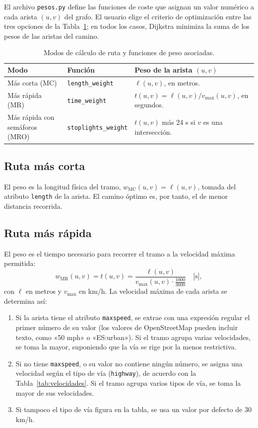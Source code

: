 \documentclass[11pt,a4paper]{article}
\newcommand{\code}[1]{\texttt{#1}}
\begin{document}
El archivo \code{pesos.py} define las funciones de coste que asignan un valor numérico a cada arista $(u,v)$ del grafo. El usuario elige el criterio de optimización entre las tres opciones de la Tabla~\ref{tab:modos}; en todos los casos, Dijkstra minimiza la suma de los pesos de las aristas del camino.

\begin{table}[H]
\centering
\caption{Modos de cálculo de ruta y funciones de peso asociadas.}\label{tab:modos}
\small
\begin{tabularx}{\linewidth}{@{}>{\raggedright\arraybackslash}p{3.4cm}>{\raggedright\arraybackslash}p{3.4cm}>{\raggedright\arraybackslash}X@{}}
\toprule
\textbf{Modo} & \textbf{Función} & \textbf{Peso de la arista $(u,v)$}\\
\midrule
Más corta (MC) & \code{length\_weight} & $\ell(u,v)$, en metros.\\
Más rápida (MR) & \code{time\_weight} & $t(u,v)=\ell(u,v)/v_{\max}(u,v)$, en segundos.\\
Más rápida con semáforos (MRO) & \code{stoplights\_weight} & $t(u,v)$ más 24 s si $v$ es una intersección.\\
\bottomrule
\end{tabularx}
\end{table}

\subsection{Ruta más corta}

El peso es la longitud física del tramo, $w_{\text{MC}}(u,v)=\ell(u,v)$, tomada del atributo \code{length} de la arista. El camino óptimo es, por tanto, el de menor distancia recorrida.

\subsection{Ruta más rápida}

El peso es el tiempo necesario para recorrer el tramo a la velocidad máxima permitida:
\[
w_{\text{MR}}(u,v)=t(u,v)=\frac{\ell(u,v)}{v_{\max}(u,v)\cdot\frac{1000}{3600}}\quad\text{[s]},
\]
con $\ell$ en metros y $v_{\max}$ en km/h. La velocidad máxima de cada arista se determina así:

\begin{enumerate}
\item Si la arista tiene el atributo \code{maxspeed}, se extrae con una expresión regular el primer número de su valor (los valores de OpenStreetMap pueden incluir texto, como «50 mph» o «ES:urban»). Si el tramo agrupa varias velocidades, se toma la mayor, suponiendo que la vía se rige por la menos restrictiva.
\item Si no tiene \code{maxspeed}, o su valor no contiene ningún número, se asigna una velocidad según el tipo de vía (\code{highway}), de acuerdo con la Tabla~\ref{tab:velocidades}. Si el tramo agrupa varios tipos de vía, se toma la mayor de sus velocidades.
\item Si tampoco el tipo de vía figura en la tabla, se usa un valor por defecto de 30 km/h.
\end{enumerate}
\end{document}
